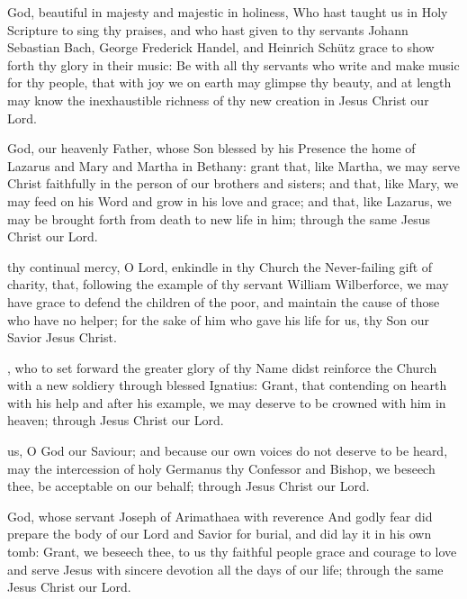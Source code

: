  God, beautiful in majesty and majestic in holiness, Who hast taught us in Holy Scripture to sing thy praises, and who hast given to thy servants Johann Sebastian Bach, George Frederick Handel, and Heinrich Schütz grace to show forth thy glory in their music: Be with all thy servants who write and make music for thy people, that with joy we on earth may glimpse thy beauty, and at length may know the inexhaustible richness of thy new creation in Jesus Christ our Lord.

 God, our heavenly Father, whose Son blessed by his Presence the home of Lazarus and Mary and Martha in Bethany: grant that, like Martha, we may serve Christ faithfully in the person of our brothers and sisters; and that, like Mary, we may feed on his Word and grow in his love and grace; and that, like Lazarus, we may be brought forth from death to new life in him; through the same Jesus Christ our Lord.

 thy continual mercy, O Lord, enkindle in thy Church the Never-failing gift of charity, that, following the example of thy servant William Wilberforce, we may have grace to defend the children of the poor, and maintain the cause of those who have no helper; for the sake of him who gave his life for us, thy Son our Savior Jesus Christ.

, who to set forward the greater glory of thy Name didst reinforce the Church with a new soldiery through blessed Ignatius: Grant, that contending on hearth with his help and after his example, we may deserve to be crowned with him in heaven; through Jesus Christ our Lord.

 us, O God our Saviour; and because our own voices do not deserve to be heard, may the intercession of holy Germanus thy Confessor and Bishop, we beseech thee, be acceptable on our behalf; through Jesus Christ our Lord.

 God, whose servant Joseph of Arimathaea with reverence And godly fear did prepare the body of our Lord and Savior for burial, and did lay it in his own tomb: Grant, we beseech thee, to us thy faithful people grace and courage to love and serve Jesus with sincere devotion all the days of our life; through the same Jesus Christ our Lord.

